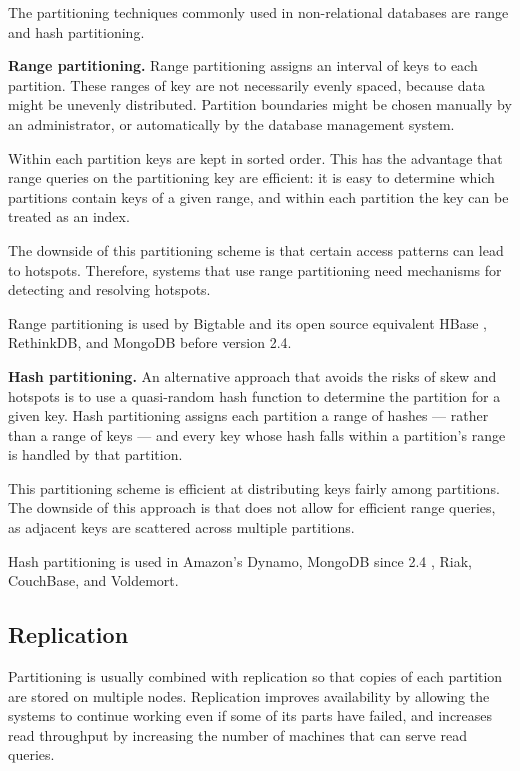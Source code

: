 The partitioning techniques commonly used in non-relational databases are range and hash partitioning.

\bigskip
\noindent
\textbf{Range partitioning.}
Range partitioning assigns an interval of keys to each partition.
These ranges of key are not necessarily evenly spaced, because data might be unevenly distributed.
Partition boundaries might be chosen manually by an administrator, or automatically by the database management system.

Within each partition keys are kept in sorted order.
This has the advantage that range queries on the partitioning key are efficient:
it is easy to determine which partitions contain keys of a given range, and within each partition the key can be treated
as an index.

The downside of this partitioning scheme is that certain access patterns can lead to hotspots.
Therefore, systems that use range partitioning need mechanisms for detecting and resolving hotspots.

Range partitioning is used by Bigtable and its open source equivalent HBase \cite{hbasebigtable:comparison},
RethinkDB, and MongoDB before version 2.4.

\bigskip
\noindent
\textbf{Hash partitioning.}
An alternative approach that avoids the risks of skew and hotspots is to use a quasi-random hash function to determine the partition
for a given key.
Hash partitioning assigns each partition a range of hashes --- rather than a range of keys --- and every key whose hash
falls within a partition's range is handled by that partition.

This partitioning scheme is efficient at distributing keys fairly among partitions.
The downside of this approach is that does not allow for efficient range queries,
as adjacent keys are scattered across multiple partitions.

Hash partitioning is used in Amazon's Dynamo, MongoDB since 2.4 \cite{mongo:hashpartitioning}, Riak, CouchBase,
and Voldemort.

\subsection{Replication}
\label{sec:replication}

Partitioning is usually combined with replication so that copies of each partition are stored on multiple nodes.
Replication improves availability by allowing the systems to continue working even if some of its parts have failed,
and increases read throughput by increasing the number of machines that can serve read queries.

